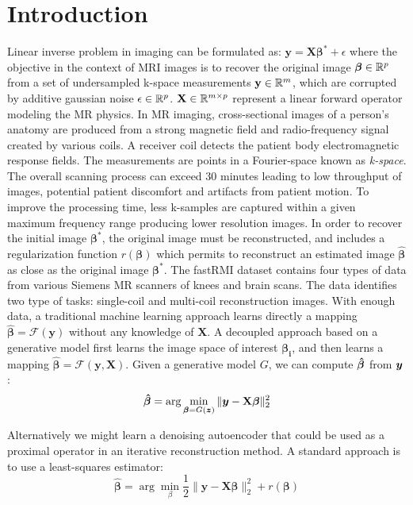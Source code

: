 \documentclass[12pt,twoside]{article}
\begin{document}
\section*{Introduction}
Linear inverse problem in imaging can be formulated as: $\textbf{y} = \mathbf{X} \bm{\beta^*} + \epsilon$ where the objective in the context of MRI images is to recover the original image
$\bm{\beta} \in \mathbb{R}^p$ from a set of undersampled k-space measurements  $\textbf{y} \in \mathbb{R}^m$,  which are corrupted by additive gaussian noise $\epsilon \in \mathbb{R}^p$.
$ \mathbf{X} \in \mathbb{R}^{m \times p}$ represent a linear forward operator modeling the MR physics. In MR imaging, cross-sectional images of a person's anatomy are produced
from a strong magnetic field and radio-frequency signal created by various coils. A receiver coil detects the patient body electromagnetic response fields. The measurements are points in
a Fourier-space known as  \emph{k-space}. The overall scanning process can exceed $30$ minutes leading to low throughput of images, potential patient discomfort and artifacts
from patient motion. To improve the processing time, less k-samples are captured within a given maximum frequency range producing lower resolution images. In order to recover the initial
image $\bm{\beta^*}$, the original image must be reconstructed, and includes a regularization  function $r(\bm{\beta})$ 
which permits to reconstruct an estimated image $\hat{\bm{\beta}}$ 
as close as the original image $\bm{\beta^*}$. The fastRMI dataset contains four types of data from various Siemens MR scanners of knees and brain scans. The data identifies two type of tasks:
 single-coil  and multi-coil reconstruction images. With enough data, a traditional machine learning approach learns directly a mapping $\bm{\hat{\beta}} = \mathcal{F}(\textbf{y})$ without any knowledge of $\mathbf{X}$.
 A decoupled approach based on a generative model first learns the image space of interest $\bm{\beta_i}$, and then learns a mapping $\bm{\hat{\beta}} = \mathcal{F}(\textbf{y}, \mathbf{X})$.
 Given a generative model $G$, we can compute $\bm{\hat{\beta}}$ from $\bm{y}$:
 $$\bm{\hat{\beta}} = \arg \min_{\bm{\beta} = G(\bm{z})} \| \bm{y} - {\mathbf X} \bm{\beta} \|_2^2 $$

 
 Alternatively we might learn a denoising autoencoder that could be used as a proximal operator in an iterative reconstruction method.
 A standard approach is to use a least-squares estimator:
 $$ \bm{\hat{\beta}} = \arg \min_{\beta} \frac{1}{2} \| \textbf{y} - \mathbf{X} \bm{\beta} \|_2^2 + r(\bm{\beta})$$
 
\end{document}
